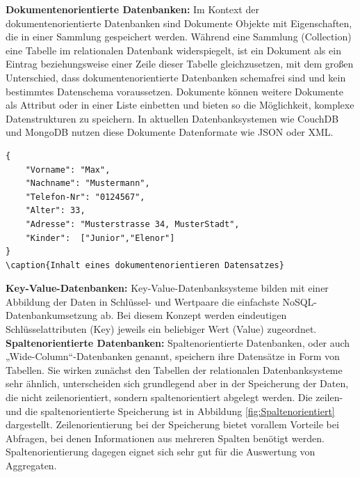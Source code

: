 \noindent
{}
\textbf{Dokumentenorientierte Datenbanken:}
Im Kontext der dokumentenorientierte Datenbanken sind Dokumente Objekte mit Eigenschaften, die in einer Sammlung gespeichert werden. 
Während eine Sammlung (Collection) eine Tabelle im relationalen Datenbank widerspiegelt, ist ein Dokument als ein Eintrag beziehungsweise einer Zeile dieser Tabelle gleichzusetzen, mit dem großen Unterschied, dass dokumentenorientierte Datenbanken schemafrei sind und kein bestimmtes Datenschema voraussetzen.
Dokumente können weitere Dokumente als Attribut oder in einer Liste einbetten und bieten so die Möglichkeit, komplexe Datenstrukturen zu speichern.  
In aktuellen Datenbanksystemen wie CouchDB und MongoDB nutzen diese Dokumente Datenformate wie JSON oder XML.\\

\begin{lstlisting}
{
	"Vorname": "Max",
	"Nachname": "Mustermann",
	"Telefon-Nr": "0124567",
	"Alter": 33,
	"Adresse": "Musterstrasse 34, MusterStadt",
	"Kinder":  ["Junior","Elenor"]
}
\caption{Inhalt eines dokumentenorientieren Datensatzes}
\end{lstlisting}

\noindent
{}
\textbf{Key-Value-Datenbanken:}
Key-Value-Datenbanksysteme bilden mit einer Abbildung der Daten in Schlüssel- und Wertpaare die einfachste NoSQL-Datenbankumsetzung ab. Bei diesem Konzept werden eindeutigen Schlüsselattributen (Key) jeweils ein beliebiger Wert (Value) zugeordnet.\\ %

%    
%
%
%
%
%

\noindent
{}
\textbf{Spaltenorientierte Datenbanken:}
Spaltenorientierte Datenbanken, oder auch „Wide\--Column“-Datenbanken genannt, speichern ihre Datensätze in Form von Tabellen.  Sie wirken zunächst den Tabellen der relationalen Datenbanksysteme sehr ähnlich, unterscheiden sich grundlegend aber in der Speicherung der Daten, die nicht zeilenorientiert, sondern spaltenorientiert abgelegt werden. 
Die zeilen- und die spaltenorientierte Speicherung ist in Abbildung \ref{fig:Spaltenorientiert} dargestellt. Zeilenorientierung bei der Speicherung bietet vorallem Vorteile bei Abfragen, bei denen Informationen aus mehreren Spalten benötigt werden.
Spaltenorientierung dagegen eignet sich sehr gut für die Auswertung von Aggregaten.\\

